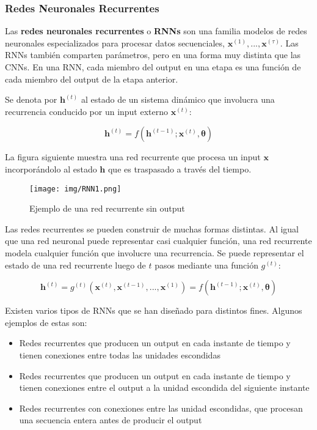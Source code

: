 \subsubsection{Redes Neuronales Recurrentes}

Las \textbf{redes neuronales recurrentes} o \textbf{RNNs} son una familia modelos de redes neuronales especializados para procesar datos secuenciales, $\bm{x}^{(1)},...,\bm{x}^{(\tau)}$. Las RNNs tambi\'en comparten par\'ametros, pero en una forma muy distinta que las CNNs. En una RNN, cada miembro del output en una etapa es una funci\'on de cada miembro del output de la etapa anterior.

Se denota por $\bm{h}^{(t)}$ al estado de un sistema din\'amico que involucra una recurrencia conducido por un input externo $\bm{x}^{(t)}$:

\begin{equation}
\bm{h}^{(t)} = f(\bm{h}^{(t-1)}; \bm{x}^{(t)}, \bm{\theta})
\end{equation}

La figura siguiente muestra una red recurrente que procesa un input $\bm{x}$ incorpor\'andolo al estado $\bm{h}$ que es traspasado a trav\'es del tiempo.

\begin{figure}[H]
\captionsetup{font=small,labelfont=small}
\caption{Ejemplo de una red recurrente sin output}
\centering
\texttt{[image: img/RNN1.png]}
\end{figure}

Las redes recurrentes se pueden construir de muchas formas distintas. Al igual que una red neuronal puede representar casi cualquier funci\'on, una red recurrente modela cualquier funci\'on que involucre una recurrencia. Se puede representar el estado de una red recurrente luego de $t$ pasos mediante una funci\'on $g^{(t)}$:

\begin{equation}
\bm{h}^{(t)} = g^{(t)}(\bm{x}^{(t)},\bm{x}^{(t-1)},...,\bm{x}^{(1)}) =  f(\bm{h}^{(t-1)}; \bm{x}^{(t)}, \bm{\theta})
\end{equation}

Existen varios tipos de RNNs que se han dise{\~{n}}ado para distintos fines. Algunos ejemplos de estas son:

\begin{itemize}
  \item Redes recurrentes que producen un output en cada instante de tiempo y tienen conexiones entre todas las unidades escondidas
  \item Redes recurrentes que producen un output en cada instante de tiempo y tienen conexiones entre el output a la unidad escondida del siguiente instante
  \item Redes recurrentes con conexiones entre las unidad escondidas, que procesan una secuencia entera antes de producir el output
\end{itemize}

